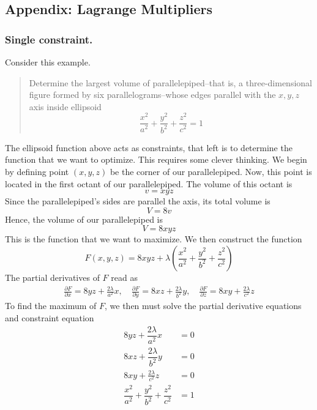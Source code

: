 \documentclass[../../Main.tex]{subfiles}
\begin{document}
\subsection{Appendix: Lagrange Multipliers}
\subsubsection{Single constraint.} Consider this example.
\begin{quotation}
    Determine the largest volume of parallelepiped--that is, a three-dimensional figure formed by six parallelograms--whose edges parallel with the $x,y,z$ axis inside ellipsoid
    \begin{equation*}
        \frac{x^2}{a^2}+\frac{y^2}{b^2}+\frac{z^2}{c^2}=1
    \end{equation*}
\end{quotation}
The ellipsoid function above acts as constraints, that left is to determine the function that we want to optimize. This requires some clever thinking. We begin by defining point $(x,y,z)$ be the corner of our parallelepiped. Now, this point is located in the first octant of our parallelepiped. The volume of this octant is 
\begin{equation*}
    v=xyz
\end{equation*}
Since the parallelepiped's sides are parallel the axis, its total volume is 
\begin{equation*}
    V=8v
\end{equation*}
Hence, the volume of our parallelepiped is 
\begin{equation*}
    V=8xyz
\end{equation*}
This is the function that we want to maximize. We then construct the function
\begin{equation*}
    F(x,y,z)=8xyz+\lambda\left(\frac{x^2}{a^2}+\frac{y^2}{b^2}+\frac{z^2}{c^2}\right)
\end{equation*}
The partial derivatives of $F$ read as 
\begin{align*}
    \frac{\partial F}{\partial x}=8yz+\frac{2\lambda}{a^2}x,\quad
    \frac{\partial F}{\partial y}=8xz+\frac{2\lambda}{b^2}y,\quad
    \frac{\partial F}{\partial z}=8xy+\frac{2\lambda}{c^2}z
\end{align*}
To find the maximum of $F$, we then must solve the partial derivative equations and constraint equation 
\begin{align*}
    8yz+\dfrac{2\lambda}{a^2}x&=0\\
    8xz+\dfrac{2\lambda}{b^2}y&=0\\
    8xy+\frac{2\lambda}{c^2}z&=0\\
    \dfrac{x^2}{a^2}+\dfrac{y^2}{b^2}+\dfrac{z^2}{c^2}&=1
\end{align*}
\end{document}
